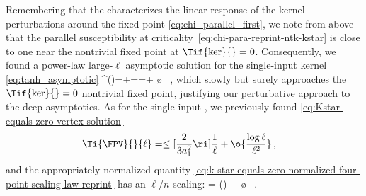 Remembering that the  characterizes the linear response of the kernel perturbations around the fixed point \eqref{eq:chi_parallel_first}, we note from above that the parallel susceptibility at criticality~\eqref{eq:chi-para-reprint-ntk-kstar} is close to one near the nontrivial fixed point at $\Tif{\ker}{}=0$. Consequently, 
we found a power-law large-$\ell$ asymptotic solution for the single-input kernel \eqref{eq:tanh_asymptotic}
\be\label{eq:tanh_asymptotic-reprint-ntk}
\ker^{(\ell)}=\Tif{\ker}{}+\Ti{\Delta\ker}{}{\ell}=\Ti{\Delta\ker}{}{\ell}=\le[\frac{1}{(-a_1)}\ri]+  \o{}   \, ,
\ee
which slowly but surely approaches the $\Tif{\ker}{}=0$ nontrivial fixed point, justifying our perturbative approach to the deep asymptotics.
As for the single-input , we previously found \eqref{eq:Kstar-equals-zero-vertex-solution}
\begin{align}\label{eq:Kstar-equals-zero-vertex-solution-reprint-ntk}
\Ti{\FPV}{}{\ell}&=\le[\frac{2}{3a_1^2}\ri]\frac{1}{\ell}+  \o{\frac{\log\ell}{\ell^2}}\, , 
\end{align}
and the appropriately normalized quantity \eqref{eq:k-star-equals-zero-normalized-four-point-scaling-law-reprint} has an $\ell/n$ scaling:
\be\label{eq:k-star-equals-zero-normalized-four-point-tanh-univ-reprint}
 = \le(\ri) + \o{} \, .
\ee





